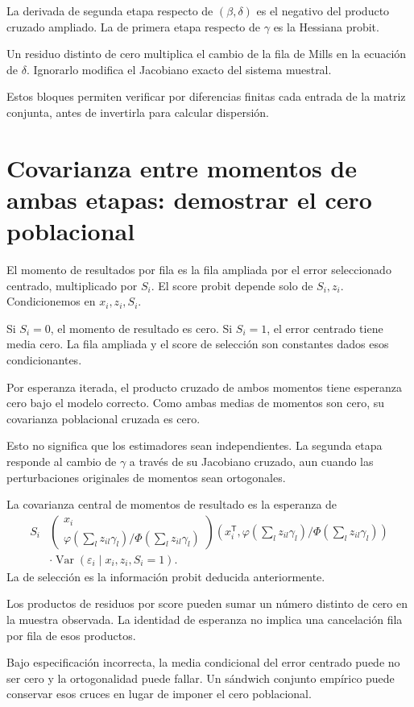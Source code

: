 \documentclass[11pt,a4paper]{article}
\newcommand{\T}{^{\mathsf T}}
\DeclareMathOperator{\Var}{Var}
\begin{document}
La derivada de segunda etapa
respecto de \((\beta,\delta)\)
es el negativo del
producto cruzado ampliado.
La de primera etapa
respecto de \(\gamma\)
es la Hessiana probit.

\begin{ejemplo}
Un residuo distinto de cero
multiplica el cambio de
la fila de Mills en
la ecuación de \(\delta\).
Ignorarlo modifica el
Jacobiano exacto del
sistema muestral.
\end{ejemplo}
Estos bloques permiten verificar
por diferencias finitas cada
entrada de la matriz conjunta,
antes de invertirla para
calcular dispersión.

\clearpage
\section{Covarianza entre momentos de ambas etapas: demostrar el cero poblacional}\label{unidad137}
El momento de resultados por fila
es la fila ampliada por
el error seleccionado centrado,
multiplicado por \(S_i\).
El score probit depende
solo de \(S_i,z_i\).
Condicionemos en \(x_i,z_i,S_i\).

Si \(S_i=0\), el momento
de resultado es cero.
Si \(S_i=1\), el error
centrado tiene media cero.
La fila ampliada y
el score de selección
son constantes dados esos
condicionantes.

Por esperanza iterada,
el producto cruzado de ambos
momentos tiene esperanza cero
bajo el modelo correcto.
Como ambas medias de momentos
son cero, su covarianza
poblacional cruzada es cero.

Esto no significa que
los estimadores sean independientes.
La segunda etapa responde
al cambio de \(\gamma\)
a través de su Jacobiano
cruzado, aun cuando las
perturbaciones originales de
momentos sean ortogonales.

La covarianza central de
momentos de resultado es
la esperanza de
\[
\begin{aligned}
S_i&
\begin{pmatrix}x_i\\\varphi(\sum_lz_{il}\gamma_l)/\Phi(\sum_lz_{il}\gamma_l)\end{pmatrix}
(x_i\T,\varphi(\sum_lz_{il}\gamma_l)/\Phi(\sum_lz_{il}\gamma_l))\\
&\cdot\Var(\varepsilon_i\mid x_i,z_i,S_i=1).
\end{aligned}
\]
La de selección es
la información probit
deducida anteriormente.

\begin{ejemplo}
Los productos de residuos
por score pueden sumar
un número distinto de cero
en la muestra observada.
La identidad de esperanza
no implica una cancelación
fila por fila de esos productos.
\end{ejemplo}
Bajo especificación incorrecta,
la media condicional del
error centrado puede no ser cero
y la ortogonalidad puede fallar.
Un sándwich conjunto empírico
puede conservar esos cruces
en lugar de imponer
el cero poblacional.
\end{document}
